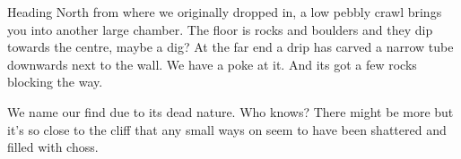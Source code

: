 Heading North from where we originally dropped in, a low pebbly crawl brings you into another large chamber. The floor is rocks and boulders and they dip towards the centre, maybe a dig? At the far end a drip has carved a narrow tube downwards next to the wall. We have a poke at it. And its got a few rocks blocking the way.
 
We name our find  due to its dead nature. Who knows? There might be more but it's so close to the cliff that any small ways on seem to have been shattered and filled with choss.

